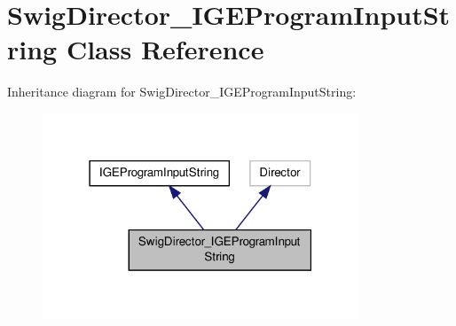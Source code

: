 \hypertarget{class_swig_director___i_g_e_program_input_string}{\section{Swig\-Director\-\_\-\-I\-G\-E\-Program\-Input\-String Class Reference}
\label{class_swig_director___i_g_e_program_input_string}
}


Inheritance diagram for Swig\-Director\-\_\-\-I\-G\-E\-Program\-Input\-String\-:\nopagebreak
\begin{figure}[H]
\begin{center}
\leavevmode
\includegraphics[width=267pt]{class_swig_director___i_g_e_program_input_string__inherit__graph}
\end{center}
\end{figure}

